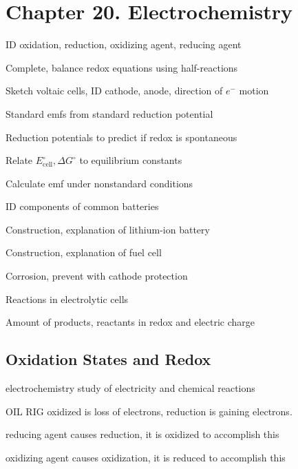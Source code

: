 \section{Chapter 20. Electrochemistry}


\secttoc

{\footnotesize \begin{multicols}{3}\begin{compactenum}
\item ID oxidation, reduction, oxidizing agent, reducing agent
\item Complete, balance redox equations using half-reactions
\item Sketch voltaic cells, ID cathode, anode, direction of $e^-$ motion
\item Standard emfs from standard reduction potential
\item Reduction potentials to predict if redox is spontaneous
\item Relate $E^\circ_\text{cell}, \Delta G^\circ$ to equilibrium constants
\item Calculate emf under nonstandard conditions
\item ID components of common batteries
\item Construction, explanation of lithium-ion battery
\item Construction, explanation of fuel cell
\item Corrosion, prevent with cathode protection
\item Reactions in electrolytic cells
\item Amount of products, reactants in redox and electric charge
\end{compactenum}\end{multicols}}


\begin{mdframed}
\begin{multicols}{2}
\subsection{Oxidation States and Redox}
\begin{compactdesc}
    \item[electrochemistry] study of electricity and chemical reactions
    \item[OIL RIG] oxidized is loss of electrons, reduction is gaining
        electrons.
    \item[reducing agent] causes reduction, it is oxidized to accomplish this
    \item[oxidizing agent] causes oxidization, it is reduced to accomplish this
\end{compactdesc}
\end{multicols}
\end{mdframed}






